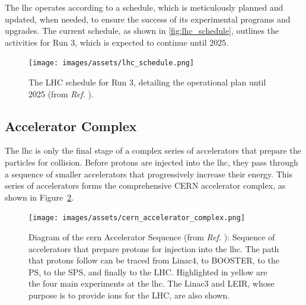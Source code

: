 The \acrshort{lhc} operates according to a schedule, which is meticulously planned and updated, when needed, to ensure the success of its experimental programs and upgrades. The current schedule, as shown in \autoref{fig:lhc_schedule}, outlines the activities for Run 3, which is expected to continue until 2025.


\begin{figure}[!htb]
    \centering
    \texttt{[image: images/assets/lhc\_schedule.png]}
    \caption[LHC Run 3 schedule]{The LHC schedule for Run 3, detailing the operational plan until 2025 (from \textit{Ref.} \cite{LHCSchedule}).}
    \label{fig:lhc_schedule}
\end{figure}

\subsection{Accelerator Complex}
\label{subsec:acc_complex}


The \acrshort{lhc} is only the final stage of a complex series of accelerators that prepare the particles for collision. Before protons are injected into the \acrshort{lhc}, they pass through a sequence of smaller accelerators that progressively increase their energy. This series of accelerators forms the comprehensive CERN accelerator complex, as shown in Figure~\ref{fig:cern_acc_complex}.

\begin{figure}[h]
	\centering
	\texttt{[image: images/assets/cern\_accelerator\_complex.png]}
	\caption[CERN Accelerator Sequence]{Diagram of the \acrshort{cern} Accelerator Sequence (from \textit{Ref.} \cite{cern-accelerator-complex}): Sequence of accelerators that prepare protons for injection into the \acrshort{lhc}. The path that protons follow can be traced from Linac4, to BOOSTER, to the PS, to the SPS, and finally to the LHC. Highlighted in yellow are the four main experiments at the \acrshort{lhc}. The Linac3 and LEIR, whose purpose is to provide ions for the LHC, are also shown.}
	\label{fig:cern_acc_complex}
\end{figure}

